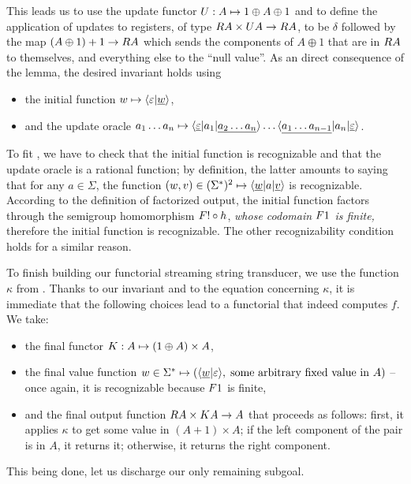 This leads us to use the update functor $\functoru : A \mapsto 1 \oplus A \oplus
1$ and to define the application of updates to registers, of type $\functorr A
\times \functoru A \to \functorr A$, to be $\delta$ followed by the map $(A
\oplus 1) + 1 \to \functorr A$ which sends the components of $A \oplus 1$ that
are in $\functorr A$ to themselves, and everything else to the \enquote{null
  value}. As an direct consequence of the lemma, the desired invariant holds
using
\begin{itemize}
  \item the initial function $w \mapsto \langle \varepsilon|\underline{w} \rangle$,
  \item and the update oracle $a_1 \dots a_n \mapsto \langle \underline\varepsilon|a_1|\underline{a_2 \dots a_n} \rangle \dots
  \langle \underline{a_1 \dots a_{n-1}}|a_n|\underline\varepsilon \rangle$.
\end{itemize}
To fit , we have to check that the initial function is recognizable and that the update oracle is a rational function; by definition, the latter amounts to saying that for any $a\in\Sigma$, the function $(w,v) \in (\Sigma^*)^2 \mapsto \langle \underline{w}|a|\underline{v} \rangle$ is recognizable. According to the definition of factorized output, the initial function factors through the semigroup homomorphism $\functor! \circ h$, \emph{whose codomain $\functor1$ is finite,} therefore the initial function is recognizable. The other recognizability condition holds for a similar reason.

To finish building our functorial streaming string transducer, we use the
function $\kappa$ from . Thanks to our
invariant and to the equation concerning $\kappa$, it is immediate that the
following choices lead to a functorial \sst that indeed computes $f$. We take:
\begin{itemize}
\item the final functor $\functork : A \mapsto (1 \oplus A)\times A$,
\item the final value function $w\in\Sigma^* \mapsto
  (\langle \underline{w}|\varepsilon \rangle,\;\text{some arbitrary fixed value in
    $A$})$ -- once again, it is recognizable because $\functor1$ is finite,
\item and the final output function $\functorr A \times \functork A \to A$ that
  proceeds as follows: first, it applies $\kappa$ to get some value in
  $(A+1)\times A$; if the left component of the pair is in $A$, it returns it;
  otherwise, it returns the right component.
\end{itemize}
This being done, let us discharge our only remaining subgoal.

